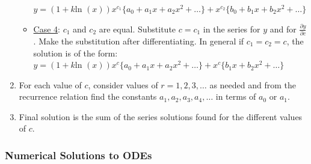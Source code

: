 \documentclass[12pt]{article}
\def\ln{\text{ln\ }} %
\begin{document}
\begin{flushleft}
\begin{enumerate}
\begin{itemize}
	$\displaystyle y=(1+k \ln(x)) x^{c_1} \{a_0 +a_1x+a_2x^2+\ldots\} + x^{c_2}\{b_0 +b_1x+b_2x^2+\ldots\} $
	\item \uline{Case 4}: $c_1$ and $c_2$ are equal. Substitute $c=c_1$ in the series for $y$ and for $\displaystyle \frac{\partial y}{\partial c}$. Make the substitution after differentiating. In general if $c_1=c_2=c$, the solution is of the form: $\displaystyle y=(1+k \ln(x)) x^c \{a_0 +a_1x +a_2 x^2+\ldots \} + x^c \{b_1x +b_2 x^2 +\ldots \} $
	\end{itemize}
	\item For each value of $c$, consider values of $r=1,2,3, \ldots$ as needed and from the recurrence relation find the constants $a_1, a_2, a_3, a_4, \ldots$ in terms of $a_0$ or $a_1$. 
	\item Final solution is the sum of the series solutions found for the different values of $c$.
	\end{enumerate} 
	
	\subsubsection{Numerical Solutions to ODEs}
	

\end{flushleft}
\end{document}
